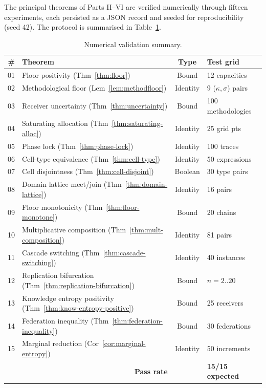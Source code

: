 \documentclass[twocolumn,11pt,a4paper]{article}
\newcommand{\catpow}{\kappa}
\newcommand{\disp}{\sigma}
\begin{document}
The principal theorems of Parts II--VI are verified numerically through fifteen experiments, each persisted as a JSON record and seeded for reproducibility (seed 42). The protocol is summarised in Table~\ref{tab:val-summary}.

\begin{table}[!htbp]
\centering
\small
\caption{Numerical validation summary.}
\label{tab:val-summary}
\begin{tabular}{rlcl}
\toprule
\# & Theorem & Type & Test grid \\
\midrule
01 & Floor positivity (Thm~\ref{thm:floor}) & Bound & 12 capacities \\
02 & Methodological floor (Lem~\ref{lem:methodfloor}) & Identity & 9 ($\catpow,\disp$) pairs \\
03 & Receiver uncertainty (Thm~\ref{thm:uncertainty}) & Bound & 100 methodologies \\
04 & Saturating allocation (Thm~\ref{thm:saturating-alloc}) & Identity & 25 grid pts \\
05 & Phase lock (Thm~\ref{thm:phase-lock}) & Identity & 100 traces \\
06 & Cell-type equivalence (Thm~\ref{thm:cell-type}) & Identity & 50 expressions \\
07 & Cell disjointness (Thm~\ref{thm:cell-disjoint}) & Boolean & 30 type pairs \\
08 & Domain lattice meet/join (Thm~\ref{thm:domain-lattice}) & Identity & 16 pairs \\
09 & Floor monotonicity (Thm~\ref{thm:floor-monotone}) & Bound & 20 chains \\
10 & Multiplicative composition (Thm~\ref{thm:mult-composition}) & Identity & 81 pairs \\
11 & Cascade switching (Thm~\ref{thm:cascade-switching}) & Identity & 40 instances \\
12 & Replication bifurcation (Thm~\ref{thm:replication-bifurcation}) & Bound & $n=2..20$ \\
13 & Knowledge entropy positivity (Thm~\ref{thm:know-entropy-positive}) & Bound & 25 receivers \\
14 & Federation inequality (Thm~\ref{thm:federation-inequality}) & Bound & 30 federations \\
15 & Marginal reduction (Cor~\ref{cor:marginal-entropy}) & Identity & 50 increments \\
\midrule
\multicolumn{2}{r}{\textbf{Pass rate}} & & \textbf{15/15 expected} \\
\bottomrule
\end{tabular}
\end{table}
\end{document}
